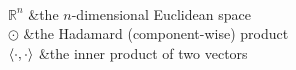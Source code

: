 \documentclass[12pt,a4paper,oneside]{Thesis} %
\begin{document}
{
\\[0.618cm]
$\mathbb{R}^n$                    &the $n$-dimensional Euclidean space\\


$\odot$                            &the Hadamard (component-wise) product\\
$\left\langle \cdot, \cdot\right \rangle$           &the inner product of two vectors\\


}
\end{document}

